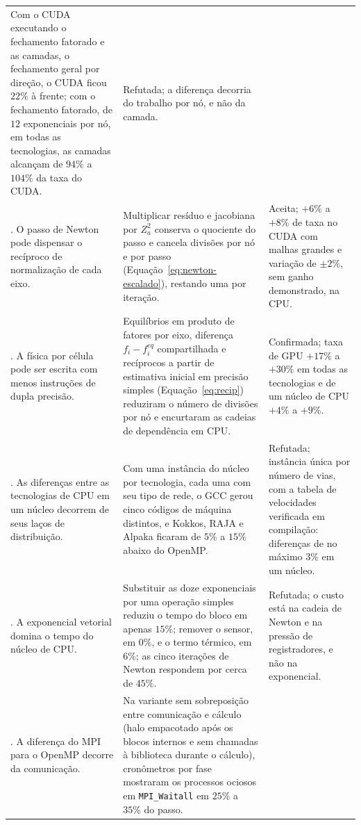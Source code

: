 \begin{longtable}{>{\raggedright\arraybackslash}p{3.2cm}>{\raggedright\arraybackslash}p{7.6cm}>{\raggedright\arraybackslash}p{4.3cm}}
        Com o CUDA executando o fechamento fatorado e as camadas, o fechamento geral por direção, o CUDA ficou $22\%$ à frente; com o fechamento fatorado, de $12$ exponenciais por nó, em todas as tecnologias, as camadas alcançam de $94\%$ a $104\%$ da taxa do CUDA. &
        Refutada; a diferença decorria do trabalho por nó, e não da camada. \\
    13. O passo de Newton pode dispensar o recíproco de normalização de cada eixo. &
        Multiplicar resíduo e jacobiana por $Z_a^2$ conserva o quociente do passo e cancela divisões por nó e por passo (Equação~\eqref{eq:newton-escalado}), restando uma por iteração. &
        Aceita; $+6\%$ a $+8\%$ de taxa no CUDA com malhas grandes e variação de $\pm 2\%$, sem ganho demonstrado, na CPU. \\
    14. A física por célula pode ser escrita com menos instruções de dupla precisão. &
        Equilíbrios em produto de fatores por eixo, diferença $f_i - f_i^{eq}$ compartilhada e recíprocos a partir de estimativa inicial em precisão simples (Equação~\eqref{eq:recip}) reduziram o número de divisões por nó e encurtaram as cadeias de dependência em CPU. &
        Confirmada; taxa de GPU $+17\%$ a $+30\%$ em todas as tecnologias e de um núcleo de CPU $+4\%$ a $+9\%$. \\
    15. As diferenças entre as tecnologias de CPU em um núcleo decorrem de seus laços de distribuição. &
        Com uma instância do núcleo por tecnologia, cada uma com seu tipo de rede, o GCC gerou cinco códigos de máquina distintos, e Kokkos, RAJA e Alpaka ficaram de $5\%$ a $15\%$ abaixo do OpenMP. &
        Refutada; instância única por número de vias, com a tabela de velocidades verificada em compilação: diferenças de no máximo $3\%$ em um núcleo. \\
    16. A exponencial vetorial domina o tempo do núcleo de CPU. &
        Substituir as doze exponenciais por uma operação simples reduziu o tempo do bloco em apenas $15\%$; remover o sensor, em $0\%$, e o termo térmico, em $6\%$; as cinco iterações de Newton respondem por cerca de $45\%$. &
        Refutada; o custo está na cadeia de Newton e na pressão de registradores, e não na exponencial. \\
    17. A diferença do MPI para o OpenMP decorre da comunicação. &
        Na variante sem sobreposição entre comunicação e cálculo (halo empacotado após os blocos internos e sem chamadas à biblioteca durante o cálculo), cronômetros por fase mostraram os processos ociosos em \texttt{MPI\_Waitall} em $25\%$ a $35\%$ do passo. &

\end{longtable}
